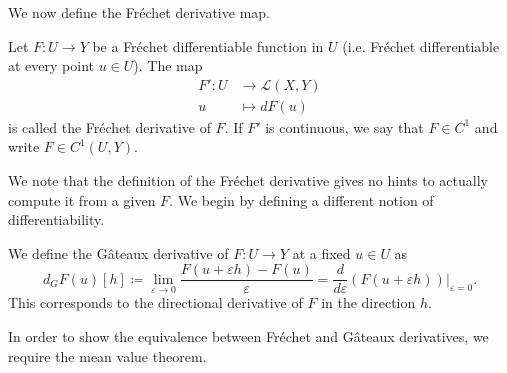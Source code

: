 We now define the Fréchet derivative map.
\begin{definition}
    Let $F:U\to Y$ be a Fréchet differentiable function in $U$ (i.e. Fréchet differentiable at every point $u\in U$). The map
    \begin{align*}
        F':U&\to \mathcal{L}(X,Y)\\
        u&\mapsto dF(u)
    \end{align*}
    is called the Fréchet derivative of $F$. If $F'$ is continuous, we say that $F\in C^1$ and write $F\in C^1(U,Y)$.
\end{definition}

We note that the definition of the Fréchet derivative gives no hints to actually compute it from a given $F$. We begin by defining a different notion of differentiability.
\begin{definition}
    We define the Gâteaux derivative of $F:U\to Y$ at a fixed $u\in U$ as
    \begin{equation*}
        d_G F(u)[h] \coloneqq \lim_{\varepsilon\to 0} \frac{F(u+\varepsilon h)-F(u)}{\varepsilon} = \frac{d}{d\varepsilon}\left.\left(F(u+\varepsilon h)\right)\right|_{\varepsilon = 0}.
    \end{equation*}
    This corresponds to the directional derivative of $F$ in the direction $h$.
\end{definition}
In order to show the equivalence between Fréchet and Gâteaux derivatives, we require the mean value theorem. 

